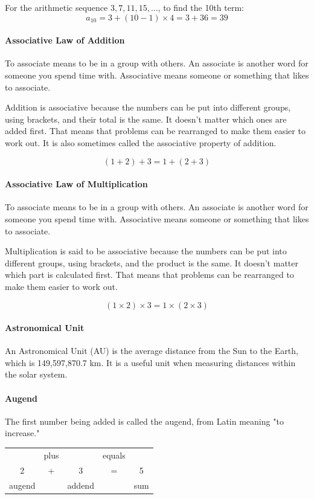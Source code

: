 \documentclass[12pt]{article}
\begin{document}
For the arithmetic sequence \(3, 7, 11, 15, \ldots\), to find the 10th term:
\[
a_{10} = 3 + (10-1) \times 4 = 3 + 36 = 39
\]

\paragraph{Associative Law of Addition}
To associate means to be in a group with others. An associate is another word for someone you spend time with. Associative means someone or something that likes to associate.

Addition is associative because the numbers can be put into different groups, using brackets, and their total is the same. It doesn't matter which ones are added first. That means that problems can be rearranged to make them easier to work out. It is also sometimes called the associative property of addition.

$$(1+2)+3=1+(2+3)$$

\paragraph{Associative Law of Multiplication}
To associate means to be in a group with others. An associate is another word for someone you spend time with. Associative means someone or something that likes to associate.

Multiplication is said to be associative because the numbers can be put into different groups, using brackets, and the product is the same. It doesn't matter which part is calculated first. That means that problems can be rearranged to make them easier to work out.

$$(1\times2)\times3=1\times(2\times3)$$

\paragraph{Astronomical Unit} An Astronomical Unit (AU) is the average distance from the Sun to the Earth, which is 149,597,870.7 km. It is a useful unit when measuring distances within the solar system.

\paragraph{Augend}
The first number being added is called the augend, from Latin meaning "to increase."

\begin{table}[H]
    \centering
    \begin{tabular}{ccccc}
     \   & plus &   \    & equals &  \ \\
     \large{2}   &  \large{+}   &   \large{3}    &   \large{=}    &  \large{5} \\
  augend &  \   & addend &   \    & sum
    \end{tabular}
\end{table}
\end{document}

